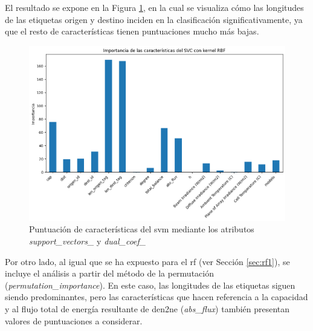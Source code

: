 \clearpage

El resultado se expone en la Figura \ref{fig:imp3}, en la cual se visualiza cómo las longitudes de las etiquetas origen y destino inciden en la clasificación significativamente, ya que el resto de características tienen puntuaciones mucho más bajas.

\vspace{3mm}

\begin{figure}[H]
    \centering
    \includegraphics[width=1\textwidth]{img/desarrollo/svm/importance3.png}
    \caption{Puntuación de características del \acrshort{svm} mediante los atributos \textit{support\_vectors\_} y \textit{dual\_coef\_}}
    \label{fig:imp3}
\end{figure}

Por otro lado, al igual que se ha expuesto para el \gls{rf} (ver Sección \ref{sec:rf1}), se incluye el análisis a partir del método de la permutación (\textit{permutation\_importance}). En este caso, las longitudes de las etiquetas siguen siendo predominantes, pero las características que hacen referencia a la capacidad y al flujo total de energía resultante de \gls{den2ne} (\textit{abs\_flux}) también presentan valores de puntuaciones a considerar.

\clearpage

